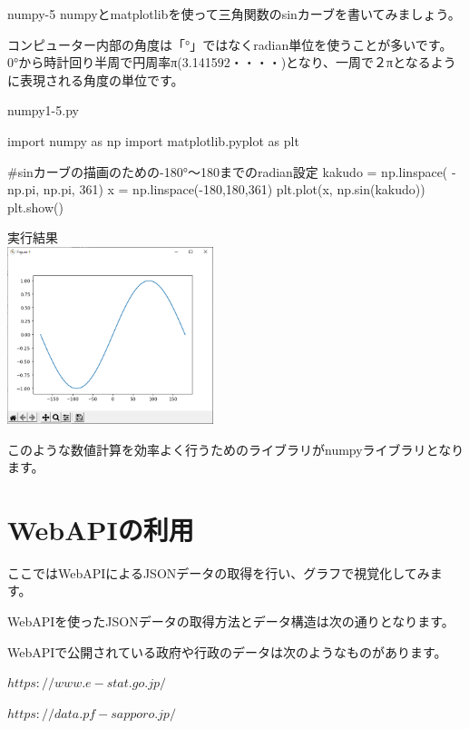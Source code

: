\begin{pabox}{numpy-5}
numpyとmatplotlibを使って三角関数のsinカーブを書いてみましょう。

コンピューター内部の角度は「°」ではなくradian単位を使うことが多いです。
0°から時計回り半周で円周率π(3.141592・・・・)となり、一周で２πとなるように表現される角度の単位です。

\begin{legbox}{numpy1-5.py}
\begin{listing}{1}
import numpy as np 
import matplotlib.pyplot as plt

#sinカーブの描画のための-180°～180までのradian設定
kakudo = np.linspace( -np.pi, np.pi, 361)
x = np.linspace(-180,180,361)
plt.plot(x, np.sin(kakudo))
plt.show()
\end{listing}

実行結果\\

\includegraphics[width=6cm]{images/graph6.png} 

\end{legbox}


\end{pabox}
このような数値計算を効率よく行うためのライブラリがnumpyライブラリとなります。

\section{WebAPIの利用}
ここではWebAPIによるJSONデータの取得を行い、グラフで視覚化してみます。

WebAPIを使ったJSONデータの取得方法とデータ構造は次の通りとなります。

WebAPIで公開されている政府や行政のデータは次のようなものがあります。

\begin{description}
	\item $https://www.e-stat.go.jp/$
	\item $https://data.pf-sapporo.jp/$
\end{description}

